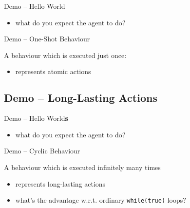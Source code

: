\documentclass{beamer}\mode<presentation>{\usetheme{AMSCesenaPurpleAndGold}}
\begin{document}
\begin{frame}{Demo \currentDemo{} -- Hello World}
    
    \begin{itemize}
        \item what do you expect the agent to do?
    \end{itemize}
\end{frame}

\begin{frame}{Demo \currentDemo{} -- One-Shot Behaviour}

    A behaviour which is executed just once:
    \vfill
    
    \begin{itemize}
        \item represents \alert{atomic} actions
    \end{itemize}
\end{frame}

\startDemo

\subsection{Demo \currentDemo{} -- Long-Lasting Actions}

\begin{frame}{Demo \currentDemo{} -- Hello World\textbf{s}}
    
    \begin{itemize}
        \item what do you expect the agent to do?
    \end{itemize}
\end{frame}

\begin{frame}{Demo \currentDemo{} -- Cyclic Behaviour}

    A behaviour which is executed infinitely many times
    \vfill
    
    \begin{itemize}
        \item represents \alert{long-lasting} actions
        \item what's the advantage w.r.t. ordinary \texttt{while(true)} loops?
    \end{itemize}
\end{frame}
\end{document}
